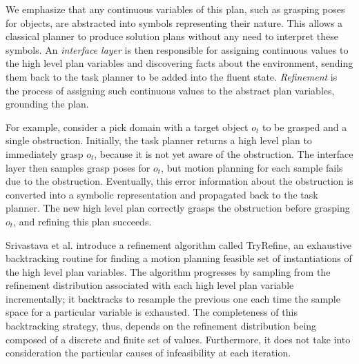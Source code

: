 
We emphasize that any continuous variables of this plan, such as grasping poses for
objects, are abstracted into symbols representing their nature. This allows a
classical planner to produce solution plans without any need to interpret these
symbols. An \emph{interface layer} is then responsible for assigning continuous values to
the high level plan variables and discovering facts about the environment, sending
them back to the task planner to be added into the fluent state. \emph{Refinement} is the
process of assigning such continuous values to the abstract plan variables, grounding the plan. 

For example, consider a pick domain with a target object $o_{t}$ to be grasped and a single obstruction.
Initially, the task planner returns a high level plan to immediately grasp $o_{t}$, because
it is not yet aware of the obstruction. The interface layer then samples grasp poses
for $o_{t}$, but motion planning for each sample fails due to the obstruction. Eventually,
this error information about the obstruction is converted into a symbolic representation
and propagated back to the task planner. The new high level plan correctly grasps the obstruction
before grasping $o_{t}$, and refining this plan succeeds.

Srivastava et al. introduce a refinement algorithm called TryRefine, an exhaustive backtracking routine for
finding a motion planning feasible set of instantiations of the high level plan
variables. The algorithm progresses by sampling from the refinement
distribution associated with each high level plan variable incrementally; it backtracks
to resample the previous one each time the sample space for a particular variable
is exhausted. The completeness of this backtracking strategy, thus, depends on the refinement distribution
being composed of a discrete and finite set of values. Furthermore, it does not take into consideration
the particular causes of infeasibility at each iteration.